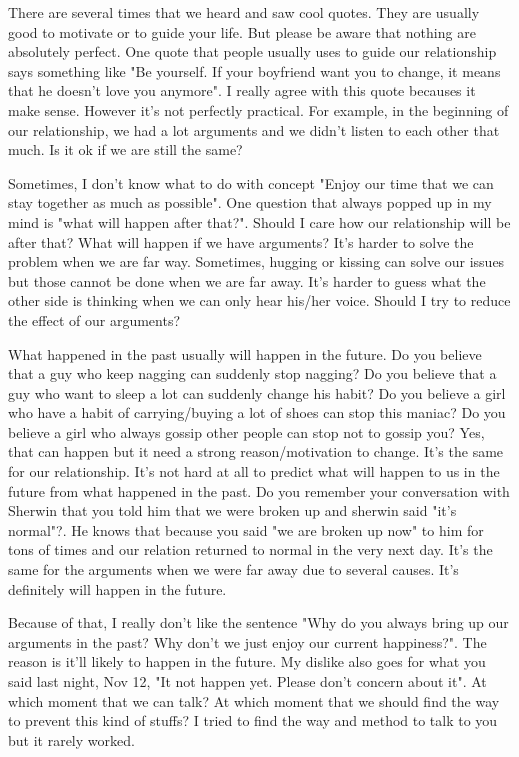 
There are several times that we heard and saw cool quotes. They are usually good to motivate or to guide your life. But please be aware that nothing are absolutely perfect. One quote that people usually uses to guide our relationship says something like "Be yourself. If your boyfriend want you to change, it means that he doesn't love you anymore". I really agree with this quote becauses it make sense. However it's not perfectly practical. For example, in the beginning of our relationship, we had a lot arguments and we didn't listen to each other that much. Is it ok if we are still the same?

Sometimes, I don't know what to do with concept "Enjoy our time that we can stay together as much as possible". One question that always popped up in my mind is "what will happen after that?". Should I care how our relationship will be after that? What will happen if we have arguments? It's harder to solve the problem when we are far way. Sometimes, hugging or kissing can solve our issues but those cannot be done when we are far away. It's harder to guess what the other side is thinking when we can only hear his/her voice. Should I try to reduce the effect of our arguments? 

What happened in the past usually will happen in the future. Do you believe that a guy who keep nagging can suddenly stop nagging? Do you believe that a guy who want to sleep a lot can suddenly change his habit? Do you believe a girl who have a habit of carrying/buying a lot of shoes can stop this maniac? Do you believe a girl who always gossip other people can stop not to gossip you? Yes, that can happen but it need a strong reason/motivation to change. It's the same for our relationship. It's not hard at all to predict what will happen to us in the future from what happened in the past. Do you remember your conversation with Sherwin that you told him that we were broken up and sherwin said "it's normal"?. He knows that because you said "we are broken up now" to him for tons of times and our relation returned to normal in the very next day. It's the same for the arguments when we were far away due to several causes. It's definitely will happen in the future.

Because of that, I really don't like the sentence "Why do you always bring up our arguments in the past? Why don't we just enjoy our current happiness?". The reason is it'll likely to happen in the future. My dislike also goes for what you said last night, Nov 12, "It not happen yet. Please don't concern about it". At which moment that we can talk? At which moment that we should find the way to prevent this kind of stuffs? I tried to find the way and method to talk to you but it rarely worked.

